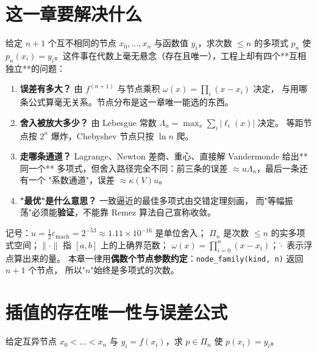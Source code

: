 

\section{这一章要解决什么}

给定 $n+1$ 个互不相同的节点 $x_0,\dots,x_n$ 与函数值 $y_i$，求次数 $\le n$ 的多项式 $p_n$
使 $p_n(x_i)=y_i$。这件事在代数上毫无悬念（存在且唯一），工程上却有四个**互相独立**的问题：

\begin{enumerate}
  \item \textbf{误差有多大？} 由 $f^{(n+1)}$ 与节点乘积 $\omega(x)=\prod_i(x-x_i)$ 决定，
        与用哪条公式算毫无关系。节点分布是这一章唯一能选的东西。
  \item \textbf{舍入被放大多少？} 由 Lebesgue 常数 $\Lambda_n=\max_x\sum_i|\ell_i(x)|$ 决定。
        等距节点按 $2^n$ 爆炸，Chebyshev 节点只按 $\ln n$ 爬。
  \item \textbf{走哪条通道？} Lagrange、Newton 差商、重心、直接解 Vandermonde 给出**同一个**
        多项式，但舍入路径完全不同：前三条的误差 $\approx u\Lambda_n$，最后一条还有一个
        "系数通道"，误差 $\approx\kappa(V)u$。
  \item \textbf{"最优"是什么意思？} 一致逼近的最佳多项式由交错定理刻画，
        而"等幅振荡"必须能\textbf{验证}，不能靠 Remez 算法自己宣称收敛。
\end{enumerate}

记号：$u=\tfrac12\varepsilon_{\text{mach}}=2^{-53}\approx1.11\times10^{-16}$ 是单位舍入；
$\Pi_n$ 是次数 $\le n$ 的实多项式空间；$\|\cdot\|$ 指 $[a,b]$ 上的上确界范数；
$\omega(x)=\prod_{i=0}^{n}(x-x_i)$；$\hat{\cdot}$ 表示浮点算出来的量。
本章一律用\textbf{偶数个节点参数约定}：\texttt{node\_family(kind, n)} 返回 $n+1$ 个节点，
所以"$n$"始终是多项式的次数。

\section{插值的存在唯一性与误差公式}

\begin{definition}[插值问题]
给定互异节点 $x_0<\dots<x_n$ 与 $y_i=f(x_i)$，求 $p\in\Pi_n$ 使 $p(x_i)=y_i$。
\end{definition}

